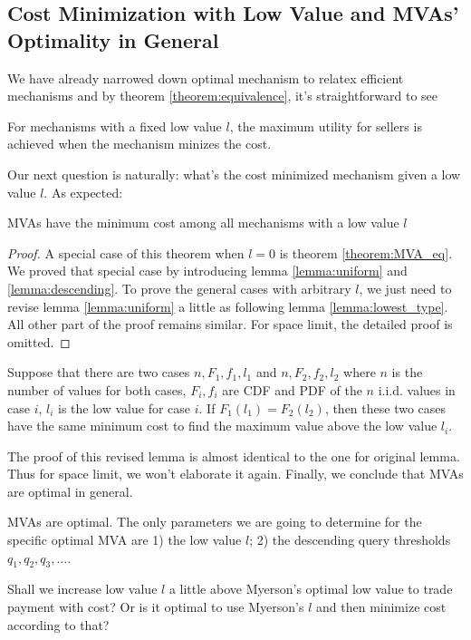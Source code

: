 \subsection{Cost Minimization with Low Value and MVAs' Optimality in General}

We have already narrowed down optimal mechanism to
relatex efficient mechanisms and by theorem \ref{theorem:equivalence},
it's straightforward to see

\begin{corollary}

For mechanisms with a fixed low value $l$, the maximum utility for sellers is
achieved when the mechanism minizes the cost.

\end{corollary}

Our next question is naturally: what's the cost minimized mechanism
given a low value $l$. As expected:

\begin{theorem}

MVAs have the minimum cost among all mechanisms with a low value $l$

\end{theorem}

\begin{proof}
A special case of this theorem when $l = 0$ is theorem \ref{theorem:MVA_eq}.
We proved that special case by introducing lemma \ref{lemma:uniform} and
\ref{lemma:descending}. To prove the general cases with arbitrary $l$, we just
need to revise lemma \ref{lemma:uniform} a little as following lemma
\ref{lemma:lowest_type}. All other part of the proof remains similar. For space
limit, the detailed proof is omitted.
\end{proof}

\begin{lemma}\label{lemma:lowest_type}
Suppose that there are two cases $n, F_1, f_1, l_1$ and $n, F_2, f_2, l_2$
where $n$ is the number of values for both cases, $F_i, f_i$ are CDF and PDF
of the $n$ i.i.d. values in case $i$, $l_i$ is the low value for case $i$.
If $F_1(l_1) = F_2(l_2)$, then these two cases have the same minimum cost
to find the maximum value above the low value $l_i$.
\end{lemma}

The proof of this revised lemma is almost identical to the one for original
lemma. Thus for space limit, we won't elaborate it again. Finally, we conclude
that MVAs are optimal in general.

\begin{corollary}

MVAs are optimal. The only parameters we are going to determine for the
specific optimal MVA are 1) the low value $l$; 2) the descending query
thresholds $q_1, q_2, q_3, \ldots$.

Shall we increase low value $l$ a little above Myerson's optimal low value
to trade payment with cost? Or is it optimal to use Myerson's $l$ and then
minimize cost according to that?

\end{corollary}

